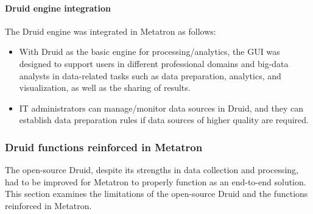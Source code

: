 \documentclass[letterpaper,10pt,english]{sphinxmanual}
\begin{document}
\paragraph{Druid engine integration}
\label{\detokenize{discovery/part01/druid_to_metatron:id2}}
The Druid engine was integrated in Metatron as follows:
\begin{itemize}
\item {} 
With Druid as the basic engine for processing/analytics, the GUI was designed to support users in different professional domains and big-data analysts in data-related tasks such as data preparation, analytics, and visualization, as well as the sharing of results.

\item {} 
IT administrators can manage/monitor data sources in Druid, and they can establish data preparation rules if data sources of higher quality are required.

\end{itemize}


\subsubsection{Druid functions reinforced in Metatron}
\label{\detokenize{discovery/part01/druid_to_metatron:id3}}
The open-source Druid, despite its strengths in data collection and processing, had to be improved for Metatron to properly function as an end-to-end solution. This section examines the limitations of the open-source Druid and the functions reinforced in Metatron.
\end{document}
